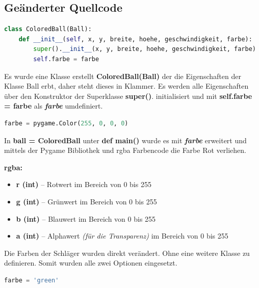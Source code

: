 \documentclass[a4paper,12pt]{article}
\begin{document}
\subsection{Geänderter Quellcode}
\begin{lstlisting}[language=Python, captionpos=b, caption={Aufgabe 2: Geänderter Quellcode}, label=lst:aufgabe-2-geaenderter-quellcode]
class ColoredBall(Ball):
    def __init__(self, x, y, breite, hoehe, geschwindigkeit, farbe):
        super().__init__(x, y, breite, hoehe, geschwindigkeit, farbe)
        self.farbe = farbe
\end{lstlisting}
\par \vspace\baselineskip
Es wurde eine Klasse erstellt \textbf{ColoredBall(Ball)} der die Eigenschaften der Klasse Ball erbt, daher steht dieses in Klammer. Es werden alle Eigenschaften über den Konstruktor der Superklasse \textbf{super()}. initialisiert und mit \textbf{self.farbe = farbe} als \textit{\textbf{farbe}} umdefiniert. \par \vspace\baselineskip
\begin{lstlisting}[language=Python, captionpos=b, caption={Aufgabe 2: farbe}, label=lst:aufgabe-2-farbe]
farbe = pygame.Color(255, 0, 0, 0)
\end{lstlisting}
\par \vspace\baselineskip
In \textbf{ball = ColoredBall} unter \textbf{def main()} wurde es mit \textit{\textbf{farbe}} erweitert und mittels der Pygame Bibliothek und rgba Farbencode die Farbe Rot verliehen. \par \vspace\baselineskip
\textbf{rgba:}
\begin{itemize}[noitemsep,topsep=0pt,parsep=0pt]
    \item \textbf{r (int)} – Rotwert im Bereich von 0 bis 255
    \item \textbf{g (int)} – Grünwert im Bereich von 0 bis 255
    \item \textbf{b (int)} – Blauwert im Bereich von 0 bis 255
    \item \textbf{a (int)} – Alphawert \textit{(für die Transparenz)} im Bereich von 0 bis 255
\end{itemize}
\par \vspace\baselineskip
Die Farben der Schläger wurden direkt verändert. Ohne eine weitere Klasse zu definieren. Somit wurden alle zwei Optionen eingesetzt. \par \vspace\baselineskip
\begin{lstlisting}[language=Python, captionpos=b, caption={Aufgabe 2: spielerSchlaeger}, label=lst:aufgabe-2-spielerschlaeger]
farbe = 'green'
\end{lstlisting}
\end{document}
